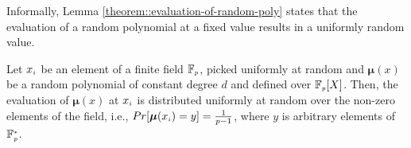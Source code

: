 Informally, Lemma \ref{theorem::evaluation-of-random-poly} states that the evaluation of a random polynomial at a fixed value results in a uniformly random value. %




\begin{lemma}\label{theorem::evaluation-of-random-poly}
Let $x_{\scriptscriptstyle i}$ be an element of a finite field $\mathbb{F}_{\scriptscriptstyle p}$, picked uniformly at random and $\bm\mu(x)$ be a random polynomial of constant degree $d$ and defined over $\mathbb{F}_{\scriptscriptstyle p}[X]$. 
%
 Then, the evaluation of $\bm\mu(x)$ at $x_{\scriptscriptstyle i}$ is distributed uniformly at random over the non-zero elements of the  field, i.e., $Pr[\bm\mu(x_{\scriptscriptstyle i})=y]=\frac{1}{p-1}$, where $y$ is arbitrary elements of $\mathbb{F}^{\scriptscriptstyle *}_{\scriptscriptstyle p}$. 


\end{lemma}



